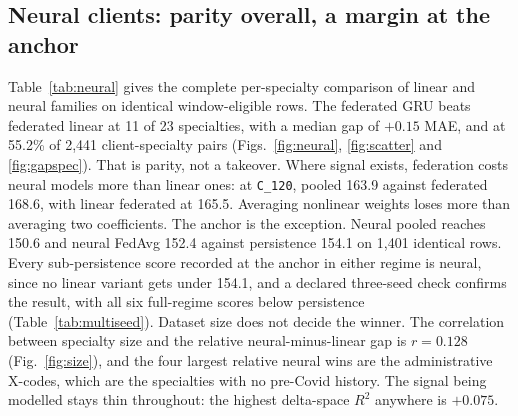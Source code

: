 \documentclass[conference]{IEEEtran}
\begin{document}
\subsection{Neural clients: parity overall, a margin at the anchor}
Table~\ref{tab:neural} gives the complete per-specialty comparison of linear and neural families on
identical window-eligible rows. The federated GRU beats federated linear at 11 of 23 specialties,
with a median gap of $+0.15$ MAE, and at 55.2\% of 2{,}441 client-specialty pairs
(Figs.~\ref{fig:neural}, \ref{fig:scatter} and \ref{fig:gapspec}). That is parity, not a takeover.
Where signal exists, federation costs neural models more than linear ones: at \texttt{C\_120},
pooled 163.9 against federated 168.6, with linear federated at 165.5. Averaging nonlinear weights
loses more than averaging two coefficients. The anchor is the exception. Neural pooled reaches
150.6 and neural FedAvg 152.4 against persistence 154.1 on 1{,}401 identical rows. Every
sub-persistence score recorded at the anchor in either regime is neural, since no linear variant
gets under 154.1, and a declared three-seed check confirms the result, with all six full-regime
scores below persistence (Table~\ref{tab:multiseed}). Dataset size does not decide the winner. The
correlation between specialty size and the relative neural-minus-linear gap is $r=0.128$
(Fig.~\ref{fig:size}), and the four largest relative neural wins are the administrative X-codes,
which are the specialties with no pre-Covid history. The signal being modelled stays thin
throughout: the highest delta-space $R^2$ anywhere is $+0.075$.
\end{document}
